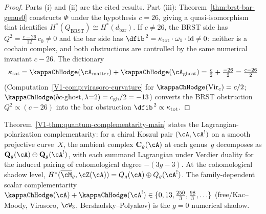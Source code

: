 \begin{proof}
Parts (i) and (ii) are the cited results. Part (iii):
Theorem~\ref{thm:brst-bar-genus0} constructs $\Phi$ under
the hypothesis $c = 26$, giving a quasi-isomorphism that
identifies $H^*(Q_{\mathrm{BRST}}) \cong H^*(d_{\mathrm{bar}})$.
If $c \neq 26$, the BRST side has $Q^2 = \frac{c-26}{12}\,c_0 \neq 0$
and the bar side has $\dfib^{\,2} = \kappa_{\mathrm{tot}} \cdot \omega_1
\cdot \mathrm{id} \neq 0$: neither is a cochain complex,
and both obstructions are controlled by the same numerical invariant
$c - 26$. The dictionary
\[
\kappa_{\mathrm{tot}}
= \kappaChHodge(\cA_{\mathrm{matter}}) + \kappaChHodge(\cA_{\mathrm{ghost}})
= \tfrac{c}{2} + \tfrac{-26}{2}
= \tfrac{c-26}{2}
\]
(Computation~\ref{V1-comp:virasoro-curvature} for $\kappaChHodge(\mathrm{Vir}_c) = c/2$;
$\kappaChHodge(\text{$bc$-ghost}, \lambda{=}2) = c_{\mathrm{gh}}/2 = -13$)
converts the BRST obstruction $Q^2 \propto (c-26)$ into
the bar obstruction $\dfib^{\,2} \propto \kappa_{\mathrm{tot}}$.
\end{proof}

\begin{remark}
\label{rem:quantum-complementarity-vol1-attribution}
Theorem~\ref{V1-thm:quantum-complementarity-main} states the
Lagrangian-polarization complementarity: for a chiral Koszul pair
$(\cA,\cA^!)$ on a smooth projective curve~$X$, the ambient complex
$\mathbf{C}_g(\cA)$ at each genus~$g$ decomposes as
$\mathbf{Q}_g(\cA) \oplus \mathbf{Q}_g(\cA^!)$, with each summand
Lagrangian under Verdier duality for the induced pairing of
cohomological degree $-(3g{-}3)$. At the cohomological shadow level,
$H^\ast(\overline{\cM}_g, \cZ(\cA)) = Q_g(\cA) \oplus Q_g(\cA^!)$.
The family-dependent scalar complementarity
$\kappaChHodge(\cA) + \kappaChHodge(\cA^!) \in \{0, 13, \tfrac{250}{3}, \tfrac{98}{3},
\ldots\}$ (free/Kac--Moody, Virasoro, $\cW_3$, Bershadsky--Polyakov)
is the $g=0$ numerical shadow.
\end{remark}


